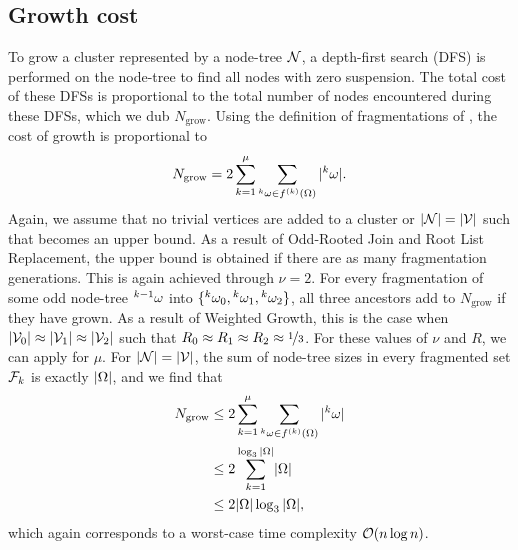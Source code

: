 \subsection{Growth cost}\label{sec:growthcost}

To grow a cluster represented by a node-tree $\mathcal{N}$, a depth-first search (DFS) is performed on the node-tree to find all nodes with zero suspension. The total cost of these DFSs is proportional to the total number of nodes encountered during these DFSs, which we dub $N_{\text{grow}}$. Using the definition of fragmentations of , the cost of growth is proportional to
\begin{equation}\label{eq:ngrow}
  N_{\text{grow}} = 2\sum_{k=1}^\mu{ \sum_{  {}^{k} \omega \in f^{(k)}(\Omega) }{ \lvert {}^{k} \omega\rvert} }.
\end{equation}
Again, we assume that no trivial vertices are added to a cluster or $|\mathcal{N}| = |\mathcal{V}|$ such that  becomes an upper bound. As a result of Odd-Rooted Join and Root List Replacement, the upper bound is obtained if there are as many fragmentation generations. This is again achieved through $\nu = 2$. For every fragmentation of some odd node-tree ${}^{k-1}\omega$ into $\{{}^{k}\omega_0, {}^{k}\omega_1, {}^{k}\omega_2\}$, all three ancestors add to $N_{\text{grow}}$ if they have grown. As a result of Weighted Growth, this is the case when $\lvert\mathcal{V}_0\rvert\approx \lvert\mathcal{V}_1\rvert\approx\lvert\mathcal{V}_2\rvert$ such that $R_0 \approx R_1 \approx R_2\approx \nicefrac{1}{3}$. For these values of $\nu$ and $R$, we can apply  for $\mu$. For $|\mathcal{N}| = |\mathcal{V}|$, the sum of node-tree sizes in every fragmented set $\mathcal{F}_k$ is exactly $\lvert\Omega\rvert$, and we find that
\begin{align*}
  \nonumber N_{\text{grow}} &\leq 2\sum_{k=1}^\mu{ \sum_{  {}^{k} \omega \in f^{(k)}(\Omega) }{ \lvert {}^{k} \omega\rvert}  } \\
  \nonumber         &\leq 2\sum_{k=1}^{\log_3{\lvert\Omega\rvert}} \lvert\Omega\rvert\\
                    &\leq 2\lvert\Omega\rvert\log_3{\lvert\Omega\rvert},
\end{align*}
which again corresponds to a worst-case time complexity $\mathcal{O}(n\log{n})$.
